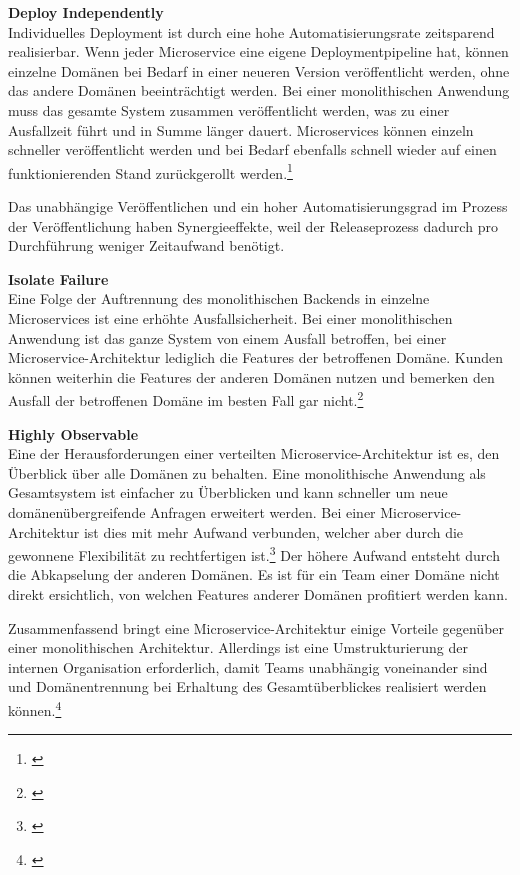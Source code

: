 \textbf{Deploy Independently}\\
Individuelles Deployment ist durch eine hohe Automatisierungsrate zeitsparend realisierbar. Wenn jeder Microservice eine eigene Deploymentpipeline hat, können einzelne Domänen bei Bedarf in einer neueren Version veröffentlicht werden, ohne das andere Domänen beeinträchtigt werden. Bei einer monolithischen Anwendung muss das gesamte System zusammen veröffentlicht werden, was zu einer Ausfallzeit führt und in Summe länger dauert. Microservices können einzeln schneller veröffentlicht werden und bei Bedarf ebenfalls schnell wieder auf einen funktionierenden Stand zurückgerollt werden.\footnote{\cite[vgl.][17]{Mezzalira2021}} 

Das unabhängige Veröffentlichen und ein hoher Automatisierungsgrad im Prozess der Veröffentlichung haben Synergieeffekte, weil der Releaseprozess dadurch pro Durchführung weniger Zeitaufwand benötigt.

\textbf{Isolate Failure}\\
Eine Folge der Auftrennung des monolithischen Backends in einzelne Microservices ist eine erhöhte Ausfallsicherheit. Bei einer monolithischen Anwendung ist das ganze System von einem Ausfall betroffen, bei einer Microservice-Architektur lediglich die Features der betroffenen Domäne. Kunden können weiterhin die Features der anderen Domänen nutzen und bemerken den Ausfall der betroffenen Domäne im besten Fall gar nicht.\footnote{\cite[vgl.][18]{Mezzalira2021}}

\textbf{Highly Observable}\\
Eine der Herausforderungen einer verteilten Microservice-Architektur ist es, den Überblick über alle Domänen zu behalten. Eine monolithische Anwendung als Gesamtsystem ist einfacher zu Überblicken und kann schneller um neue domänenübergreifende Anfragen erweitert werden. Bei einer Microservice-Architektur ist dies mit mehr Aufwand verbunden, welcher aber durch die gewonnene Flexibilität zu rechtfertigen ist.\footnote{\cite[vgl.][18]{Mezzalira2021}} Der höhere Aufwand entsteht durch die Abkapselung der anderen Domänen. Es ist für ein Team einer Domäne nicht direkt ersichtlich, von welchen Features anderer Domänen profitiert werden kann.

Zusammenfassend bringt eine Microservice-Architektur einige Vorteile gegenüber einer monolithischen Architektur. Allerdings ist eine Umstrukturierung der internen Organisation erforderlich, damit Teams unabhängig voneinander sind und Domänentrennung bei Erhaltung des Gesamtüberblickes realisiert werden können.\footnote{\cite[vgl.][18]{Mezzalira2021}}

